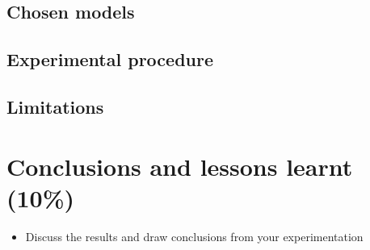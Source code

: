 \documentclass[twoside,11pt]{article}
\begin{document}
\subsection{Chosen models}
\subsection{Experimental procedure}
\subsection{Limitations}

\section{Conclusions and lessons learnt (10\%)}
\begin{itemize}
    \item Discuss the results and draw conclusions from your experimentation
\end{itemize}




\vskip 0.2in

\end{document}

